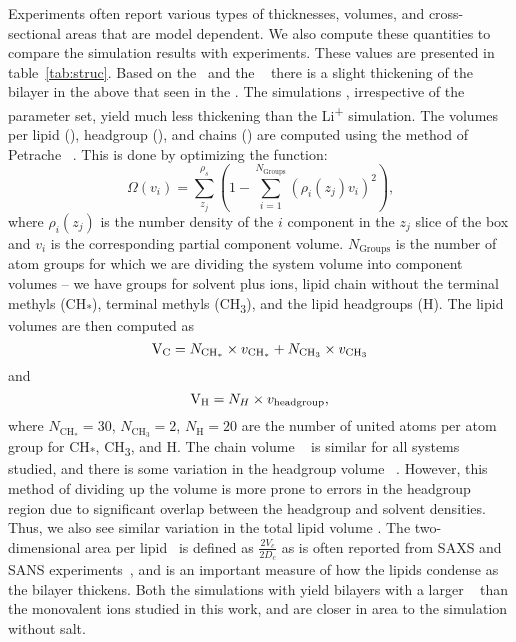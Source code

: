 Experiments often report various types of thicknesses, volumes, and cross-sectional areas that are model dependent.
We also compute these quantities to compare the simulation results with experiments. These values are presented in 
table~\ref{tab:struc}.
Based on the \dhh~and the \dc~ there is a slight thickening 
of the bilayer in the  above that seen in the .
The \mg simulations {, irrespective of the parameter set, yield} much less thickening than {the}  
Li\textsuperscript{+} {simulation.} 
{The volumes per lipid (\vl), headgroup (\vh), and chains (\vc) are computed using the method of
Petrache \etal~\cite{petrache:1997}. This is done by optimizing the function:
\begin{equation}
    \label{eq:volumeobj}
    \Omega(v_i)=\sum^{\rho_s}_{z_j}(1-\sum^{N_{\text{Groups}}}_{i=1}{(\rho_i(z_j)v_i)^2})\text{,}
\end{equation}
where $\rho_i(z_j)$ is the number density of the $i$ component in the
$z_j$ slice of the box and $v_i$ is the corresponding partial component volume. $N_\text{Groups}$ is the number
of atom groups for which we are dividing the system volume into component volumes -- we have groups for solvent plus ions,
lipid chain without the terminal methyls (CH\textsubscript{*}), terminal methyls (CH\textsubscript{3}), and the lipid headgroups (H).
The lipid volumes are then computed as 
\begin{equation}
    \text{$\text{V}_{\text{C}}$}=N_{\text{CH}_*} \times v_{\text{CH}_*}+N_{\text{CH}_3} \times v_{\text{CH\textsubscript{3}}}
\end{equation}
and
\begin{equation}
    \text{$\text{V}_{\text{H}}$}=N_{H} \times v_{\text{headgroup}}\text{,}
\end{equation}
where $N_{\text{CH}_*}=30$, $N_{\text{CH}_3}=2$, $N_{\text{H}}=20$ are the number of united atoms per atom group for CH\textsubscript{*},
CH\textsubscript{3}, and H.
}{
The chain volume \vc~ is similar for all systems studied, and there is some variation in the headgroup volume \vh~.
However, this method of dividing up the volume is more prone to errors in the headgroup region due to 
significant overlap between the headgroup and solvent densities. 
Thus, we also see similar variation in the total lipid volume \vl. 
}
The two-dimensional area per lipid \al~is defined as
{$\frac{2V_c}{2D_c}$ as is often reported from SAXS and SANS experiments~\cite{nagle:2000}, and is an important
measure of how the lipids condense as the bilayer thickens.}
{Both the simulations with \mg yield bilayers with a larger \al~ 
    than the monovalent ions studied in this work, and are closer
in area to the simulation without salt.
}


